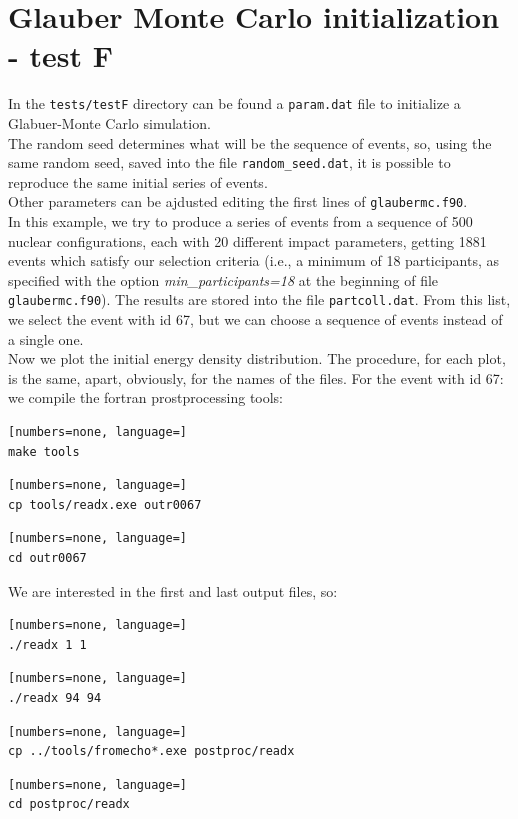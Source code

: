 \section{Glauber Monte Carlo initialization - test F}
In the {\tt tests/testF} directory can be found a {\tt param.dat} file to initialize a Glabuer-Monte Carlo simulation.\\
The random seed determines what will be the sequence of events, so, using the same random seed, saved into the file {\tt random\_seed.dat}, it is possible to reproduce the same initial series of events.\\
Other parameters can be ajdusted editing the first lines of {\tt glaubermc.f90}.\\
In this example, we try to produce a series of events from a sequence of 500 nuclear configurations, each with 20 different impact parameters, getting 1881 events which satisfy our selection criteria (i.e., a minimum of 18 participants, as specified with the option \emph{min\_participants=18} at the beginning of file {\tt glaubermc.f90}). The results are stored into the file {\tt partcoll.dat}. From this list, we select the event with id 67, but we can choose a sequence of events instead of a single one.\\
Now we plot the initial energy density distribution. The procedure, for each plot, is the same, apart, obviously, for the names of the files. For the event with id 67:\\
we compile the fortran prostprocessing tools:
\begin{lstlisting}[numbers=none, language=]
make tools
\end{lstlisting}
\begin{lstlisting}[numbers=none, language=]
cp tools/readx.exe outr0067
\end{lstlisting}
\begin{lstlisting}[numbers=none, language=]
cd outr0067
\end{lstlisting}
We are interested in the first and last output files, so:
\begin{lstlisting}[numbers=none, language=]
./readx 1 1
\end{lstlisting}
\begin{lstlisting}[numbers=none, language=]
./readx 94 94
\end{lstlisting}
\begin{lstlisting}[numbers=none, language=]
cp ../tools/fromecho*.exe postproc/readx
\end{lstlisting}
\begin{lstlisting}[numbers=none, language=]
cd postproc/readx
\end{lstlisting}
